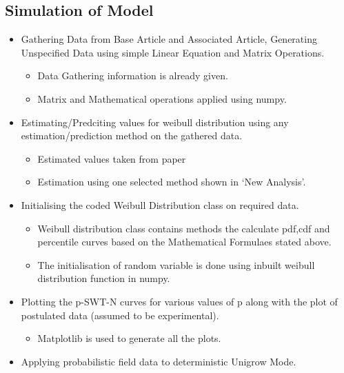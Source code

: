 \documentclass[11pt]{article}
\providecommand{\tightlist}{%
      \setlength{\itemsep}{0pt}\setlength{\parskip}{0pt}}
\begin{document}
\hypertarget{simulation-of-model}{%
\subsection{Simulation of Model}\label{simulation-of-model}}

\begin{itemize}
\tightlist
\item
  Gathering Data from Base Article and Associated Article, Generating
  Unspecified Data using simple Linear Equation and Matrix Operations.

  \begin{itemize}
  \tightlist
  \item
    Data Gathering information is already given.
  \item
    Matrix and Mathematical operations applied using numpy.
  \end{itemize}
\item
  Estimating/Predciting values for weibull distribution using any
  estimation/prediction method on the gathered data.

  \begin{itemize}
  \tightlist
  \item
    Estimated values taken from paper
  \item
    Estimation using one selected method shown in `New Analysis'.
  \end{itemize}
\item
  Initialising the coded Weibull Distribution class on required data.

  \begin{itemize}
  \tightlist
  \item
    Weibull distribution class contains methods the calculate pdf,cdf
    and percentile curves based on the Mathematical Formulaes stated
    above.
  \item
    The initialisation of random variable is done using inbuilt weibull
    distribution function in numpy.
  \end{itemize}
\item
  Plotting the p-SWT-N curves for various values of p along with the
  plot of postulated data (assumed to be experimental).

  \begin{itemize}
  \tightlist
  \item
    Matplotlib is used to generate all the plots.
  \end{itemize}
\item
  Applying probabilistic field data to deterministic Unigrow Mode.
\end{itemize}
\end{document}
